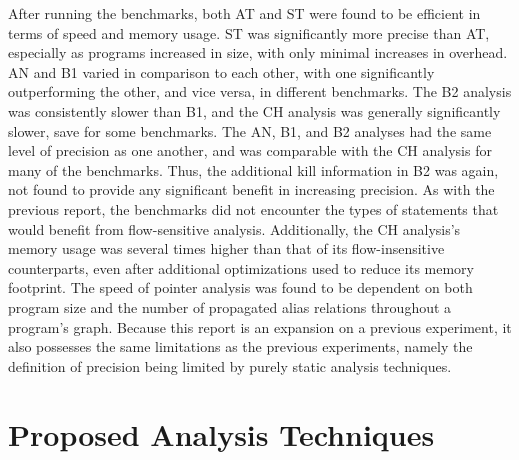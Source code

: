 After running the benchmarks, both AT and ST were found to be efficient in terms of speed and memory usage. ST was significantly more precise than AT, especially as programs increased in size, with only minimal increases in overhead. AN and B1 varied in comparison to each other, with one significantly outperforming the other, and vice versa, in different benchmarks. The B2 analysis was consistently slower than B1, and the CH analysis was generally significantly slower, save for some benchmarks. The AN, B1, and B2 analyses had the same level of precision as one another, and was comparable with the CH analysis for many of the benchmarks. Thus, the additional kill information in B2 was again, not found to provide any significant benefit in increasing precision. As with the previous report, the benchmarks did not encounter the types of statements that would benefit from flow-sensitive analysis. Additionally, the CH analysis's memory usage was several times higher than that of its flow-insensitive counterparts, even after additional optimizations used to reduce its memory footprint. The speed of pointer analysis was found to be dependent on both program size and the number of propagated alias relations throughout a program's graph. Because this report is an expansion on a previous experiment, it also possesses the same limitations as the previous experiments, namely the definition of precision being limited by purely static analysis techniques.

\section{Proposed Analysis Techniques}

